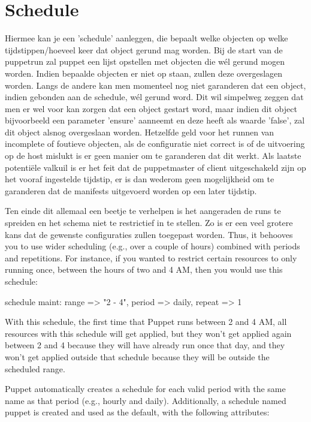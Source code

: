 \section{Schedule}

Hiermee kan je een 'schedule' aanleggen, die bepaalt welke objecten op welke tijdstippen/hoeveel keer dat object gerund mag worden. Bij de start van de puppetrun zal puppet een lijst opstellen met objecten die w\'el gerund mogen worden. Indien bepaalde objecten er niet op staan, zullen deze overgeslagen worden. Langs de andere kan men momenteel nog niet garanderen dat een object, indien gebonden aan de schedule, w\'el gerund word. Dit wil simpelweg zeggen dat men er wel voor kan zorgen dat een object gestart word, maar indien dit object bijvoorbeeld een parameter 'ensure' aanneemt en deze heeft als waarde 'false', zal dit object alsnog overgeslaan worden. Hetzelfde geld voor het runnen van incomplete of foutieve objecten, als de configuratie niet correct is of de uitvoering op de host mislukt is er geen manier om te garanderen dat dit werkt. Als laatste potenti\"ele valkuil is er het feit dat de puppetmaster of client uitgeschakeld zijn op het vooraf ingestelde tijdstip, er is dan wederom geen mogelijkheid om te garanderen dat de manifests uitgevoerd worden op een later tijdstip.

Ten einde dit allemaal een beetje te verhelpen is het aangeraden de runs te spreiden en het schema niet te restrictief in te stellen. Zo is er een veel grotere kans dat de gewenste configuraties zullen toegepast worden.
Thus, it behooves you to use wider scheduling (e.g., over a couple of hours) combined with periods and repetitions. For instance, if you wanted to restrict certain resources to only running once, between the hours of two and 4 AM, then you would use this schedule:

schedule { maint:
  range => "2 - 4",
  period => daily,
  repeat => 1
}

With this schedule, the first time that Puppet runs between 2 and 4 AM, all resources with this schedule will get applied, but they won’t get applied again between 2 and 4 because they will have already run once that day, and they won’t get applied outside that schedule because they will be outside the scheduled range.

Puppet automatically creates a schedule for each valid period with the same name as that period (e.g., hourly and daily). Additionally, a schedule named puppet is created and used as the default, with the following attributes:

